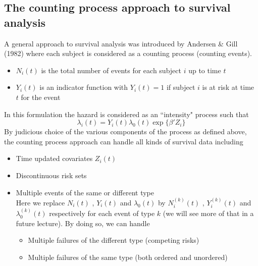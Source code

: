 \documentclass[10pt]{book}
\begin{document}
\subsection{The counting process approach to survival analysis}
A general approach to survival analysis was introduced by Andersen \& Gill (1982) where each subject is considered as a counting process (counting events).
\begin{itemize}
\item $N_i(t)$ is the total number of events for each subject $i$ up to time $t$
\item $Y_i(t)$ is an indicator function with $Y_{i}(t)=1$ if subject $i$ is at risk at time $t$ for the event
\end{itemize}
In this formulation the hazard is considered as an ``intensity" process such that
$$
\lambda_i(t)=Y_i(t)\lambda_0(t)\exp\{\beta'Z_i\}
$$
By judicious choice of the various components of the process as defined above, the counting process approach can handle all kinds of survival data including
\begin{itemize}
\item Time updated covariates $Z_i(t)$
\item Discontinuous risk sets
\item Multiple events of the same or different type\\
Here we replace $N_i(t)$ , $Y_i(t)$ and $\lambda_0(t)$ by $N^{(k)}_i(t)$ , $Y^{(k)}_i(t)$ and $\lambda^{(k)}_0(t)$
respectively for each event of type $k$ (we will see more of that in a future lecture).  By doing so, we can handle
\begin{itemize}
\item Multiple failures of the different type (competing risks)
\item Multiple failures of the same type (both ordered and unordered)
\end{itemize}
\end{itemize}
\end{document}

